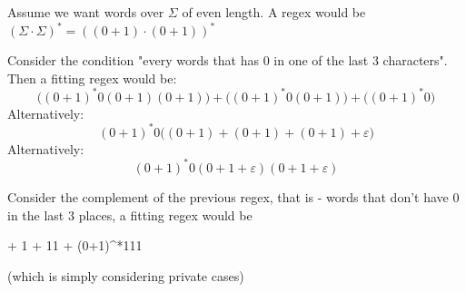 \begin{example}
	Assume we want words over $\Sigma$ of even length. A regex would be $(\Sigma \cdot \Sigma)^* = ((0+1)\cdot(0+1))^*$
\end{example}
\begin{example}
	Consider the condition "every words that has $0$ in one of the last $3$ characters". Then a fitting regex would be:
	\[
	\big((0+1)^*0(0+1)(0+1)\big) + \big((0+1)^*0(0+1)\big) + \big((0+1)^*0\big)
	\]
	Alternatively:
	\[
	(0+1)^* 0 \big((0+1)+(0+1) + (0+1) + \varepsilon \big)
	\]
	Alternatively:
	\[
	(0+1)^* 0 (0+1+\varepsilon)(0+1+\varepsilon)
	\]
\end{example}
\begin{example}
	Consider the complement of the previous regex, that is - words that don't have $0$ in the last $3$ places, a fitting regex would be\begin{flalign*}
		\varepsilon + 1 + 11 + (0+1)^*111
	\end{flalign*}
	(which is simply considering private cases)
\end{example}

